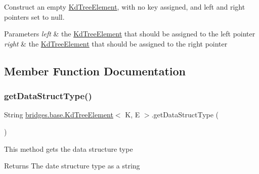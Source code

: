 Construct an empty \mbox{\hyperlink{classbridges_1_1base_1_1_kd_tree_element}{Kd\+Tree\+Element}}, with no key assigned, and left and right pointers set to null. 
\begin{DoxyParams}{Parameters}
{\em left} & the \mbox{\hyperlink{classbridges_1_1base_1_1_kd_tree_element}{Kd\+Tree\+Element}} that should be assigned to the left pointer \\
\hline
{\em right} & the \mbox{\hyperlink{classbridges_1_1base_1_1_kd_tree_element}{Kd\+Tree\+Element}} that should be assigned to the right pointer \\
\hline
\end{DoxyParams}


\subsection{Member Function Documentation}
\mbox{\label{classbridges_1_1base_1_1_kd_tree_element_a56b98bd1f3e1e5c0c37519c4b3cf5ba2}} 
\subsubsection{\texorpdfstring{get\+Data\+Struct\+Type()}{getDataStructType()}}
{\footnotesize\ttfamily String \mbox{\hyperlink{classbridges_1_1base_1_1_kd_tree_element}{bridges.\+base.\+Kd\+Tree\+Element}}$<$ K, E $>$.get\+Data\+Struct\+Type (\begin{DoxyParamCaption}{ }\end{DoxyParamCaption})}

This method gets the data structure type

\begin{DoxyReturn}{Returns}
The date structure type as a string 
\end{DoxyReturn}
\mbox{\label{classbridges_1_1base_1_1_kd_tree_element_a2469fcfe38e921ae48338ef1fd347c4a}} 
